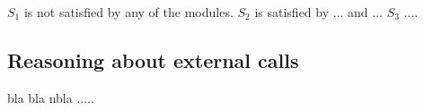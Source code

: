  $S_1$ is not satisfied by any of the modules.
 $S_2$ is satisfied by ...  and ... 
 $S_3$ ....
 
 
% 
%
 

\subsection{Reasoning about external calls}
\label{sec:how}

bla bla nbla .....

%
 

